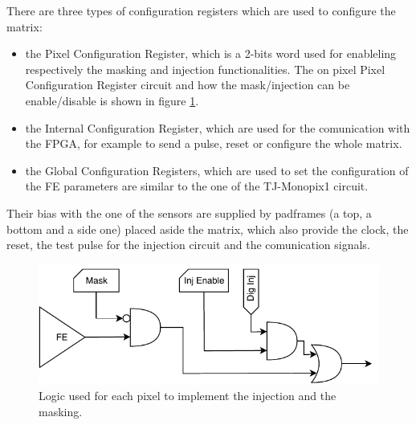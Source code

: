         There are three types of configuration registers which are used to configure the matrix: 
        \begin{itemize}
            \item the Pixel Configuration Register, which is a 2-bits word used for enableling respectively the masking and injection functionalities. %
            The on pixel Pixel Configuration Register circuit and how the mask/injection can be enable/disable is shown in figure \ref{fig:pixel_cfg}.
            \item the Internal Configuration Register, which are used for the comunication with the FPGA, for example to send a pulse, reset or configure the whole matrix.
            \item the Global Configuration Registers, which are used to set the configuration of the FE parameters are similar to the one of the TJ-Monopix1 circuit.
        \end{itemize}
        Their bias with the one of the sensors are supplied by padframes (a top, a bottom and a side one) placed aside the matrix, which also provide the clock, the reset, the test pulse for the injection circuit and the comunication signals.
        \begin{figure}[h!]
            \centering
            \includegraphics[width=.7\linewidth]{figures/ARCADIA/pixel_cfg.pdf}
            \caption{Logic used for each pixel to implement the injection and the masking.}
            \label{fig:pixel_cfg}
        \end{figure}    
